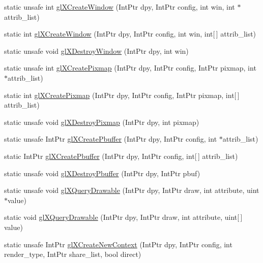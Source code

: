 \begin{DoxyCompactItemize}
\item 
static unsafe int \hyperlink{class_tao_1_1_platform_1_1_x11_1_1_glx_a22cf8dc8ea380742183535b07252d52c}{glXCreateWindow} (IntPtr dpy, IntPtr config, int win, int $\ast$attrib\_\-list)
\item 
static int \hyperlink{class_tao_1_1_platform_1_1_x11_1_1_glx_ac4860fdf8d2fd867b65a7216f3589d63}{glXCreateWindow} (IntPtr dpy, IntPtr config, int win, int\mbox{[}$\,$\mbox{]} attrib\_\-list)
\item 
static unsafe void \hyperlink{class_tao_1_1_platform_1_1_x11_1_1_glx_aacbfa56df3389a3414d7eecce81df181}{glXDestroyWindow} (IntPtr dpy, int win)
\item 
static unsafe int \hyperlink{class_tao_1_1_platform_1_1_x11_1_1_glx_aa03a5d88950c4d8d4837927ff514af3d}{glXCreatePixmap} (IntPtr dpy, IntPtr config, IntPtr pixmap, int $\ast$attrib\_\-list)
\item 
static int \hyperlink{class_tao_1_1_platform_1_1_x11_1_1_glx_a9d9e47364becb69b8873217786ae00e6}{glXCreatePixmap} (IntPtr dpy, IntPtr config, IntPtr pixmap, int\mbox{[}$\,$\mbox{]} attrib\_\-list)
\item 
static unsafe void \hyperlink{class_tao_1_1_platform_1_1_x11_1_1_glx_ab59bdb381d7d64dc7e5c7349af0315c9}{glXDestroyPixmap} (IntPtr dpy, int pixmap)
\item 
static unsafe IntPtr \hyperlink{class_tao_1_1_platform_1_1_x11_1_1_glx_a3e2410de2473fb8bd52e05ef8438ff02}{glXCreatePbuffer} (IntPtr dpy, IntPtr config, int $\ast$attrib\_\-list)
\item 
static IntPtr \hyperlink{class_tao_1_1_platform_1_1_x11_1_1_glx_a9b816b91c1d5d1d6e59cb9ae48270121}{glXCreatePbuffer} (IntPtr dpy, IntPtr config, int\mbox{[}$\,$\mbox{]} attrib\_\-list)
\item 
static unsafe void \hyperlink{class_tao_1_1_platform_1_1_x11_1_1_glx_ab980de7be47dedc68d86987d206a4f9b}{glXDestroyPbuffer} (IntPtr dpy, IntPtr pbuf)
\item 
static unsafe void \hyperlink{class_tao_1_1_platform_1_1_x11_1_1_glx_a76284c388170b2c62e2df7385973fe00}{glXQueryDrawable} (IntPtr dpy, IntPtr draw, int attribute, uint $\ast$value)
\item 
static void \hyperlink{class_tao_1_1_platform_1_1_x11_1_1_glx_a3154050a136e4a3debf46f7951c89f90}{glXQueryDrawable} (IntPtr dpy, IntPtr draw, int attribute, uint\mbox{[}$\,$\mbox{]} value)
\item 
static unsafe IntPtr \hyperlink{class_tao_1_1_platform_1_1_x11_1_1_glx_a3c90fae6c360f7982bff94f151a0e128}{glXCreateNewContext} (IntPtr dpy, IntPtr config, int render\_\-type, IntPtr share\_\-list, bool direct)

\end{DoxyCompactItemize}
